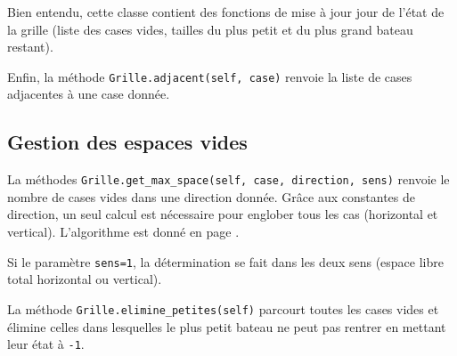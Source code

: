 \medskip

Bien entendu, cette classe contient des fonctions de mise à jour jour de l'état de la grille (liste des cases vides, tailles du plus petit et du plus grand bateau restant).

\medskip

Enfin, la méthode \texttt{Grille.adjacent(self, case)} renvoie la liste de cases adjacentes à une case donnée.

\subsection{Gestion des espaces vides}
La méthodes \texttt{Grille.get\_max\_space(self, case, direction, sens)} renvoie le nombre de cases vides dans une direction donnée. Grâce aux constantes de direction, un seul calcul est nécessaire pour englober tous les cas (horizontal et vertical). L'algorithme est donné en page \pageref{get_max_space}.

Si le paramètre \texttt{sens=1}, la détermination se fait dans les deux sens (espace libre total horizontal ou vertical).

\medskip

La méthode \texttt{Grille.elimine\_petites(self)} parcourt toutes les cases vides et élimine celles dans lesquelles le plus petit bateau ne peut pas rentrer en mettant leur état à \texttt{-1}.

